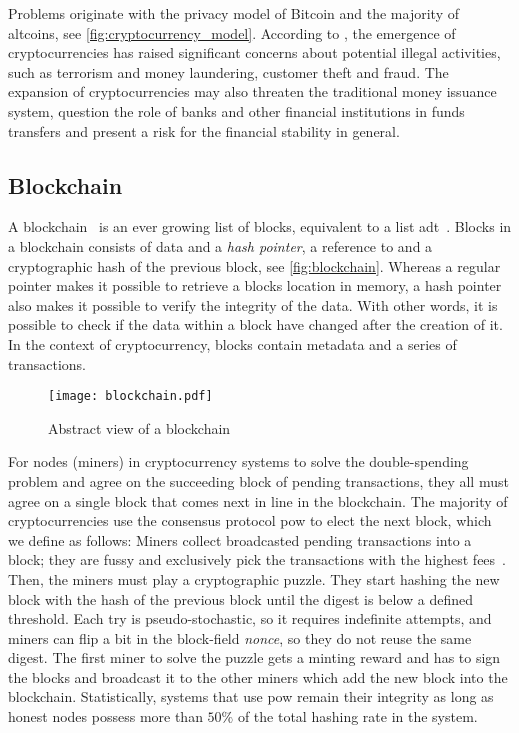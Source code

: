 Problems originate with the privacy model of Bitcoin and the majority of altcoins, see \autoref{fig:cryptocurrency_model}. According to \cite{bitcoin_regulation}, the emergence of cryptocurrencies has raised significant concerns about potential illegal activities, such as terrorism and money laundering, customer theft and fraud. The expansion of cryptocurrencies may also threaten the traditional money issuance system, question the role of banks and other financial institutions in funds transfers and present a risk for the financial stability in general.

\subsection{Blockchain}\label{sec:blockchain}
A blockchain~\cite{bitcoin_book} is an ever growing list of blocks, equivalent to a list \ac{adt}~\cite{bitcoin_book}. Blocks in a blockchain consists of data and a \emph{hash pointer}, a reference to and a cryptographic hash of the previous block, see \autoref{fig:blockchain}. Whereas a regular pointer makes it possible to retrieve a blocks location in memory, a hash pointer also makes it possible to verify the integrity of the data. With other words, it is possible to check if the data within a block have changed after the creation of it. In the context of cryptocurrency, blocks contain metadata and a series of transactions.

\begin{figure}[ht]
    \texttt{[image: blockchain.pdf]}
    \caption{Abstract view of a blockchain}
    \label{fig:blockchain}
\end{figure}

For nodes (miners) in cryptocurrency systems to solve the double-spending problem and agree on the succeeding block of pending transactions, they all must agree on a single block that comes next in line in the blockchain. The majority of cryptocurrencies use the consensus protocol \ac{pow} to elect the next block, which we define as follows: Miners collect broadcasted pending transactions into a block; they are fussy and exclusively pick the transactions with the highest fees~\cite{trends_fee, trans_fee}. Then, the miners must play a cryptographic puzzle. They start hashing the new block with the hash of the previous block until the digest is below a defined threshold. Each try is pseudo-stochastic, so it requires indefinite attempts, and miners can flip a bit in the block-field \emph{nonce}, so they do not reuse the same digest. The first miner to solve the puzzle gets a minting reward and has to sign the blocks and broadcast it to the other miners which add the new block into the blockchain. Statistically, systems that use \ac{pow} remain their integrity as long as honest nodes possess more than $50\%$ of the total hashing rate in the system.


